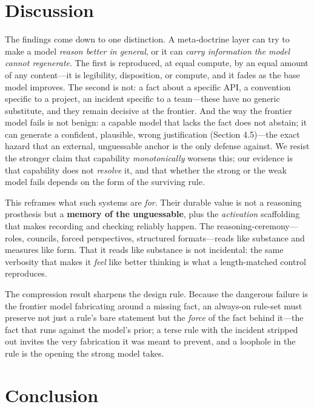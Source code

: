 \documentclass[11pt]{article}
\begin{document}
\section{Discussion}

The findings come down to one distinction. A meta-doctrine layer can try to make a model
\emph{reason better in general}, or it can \emph{carry information the model cannot regenerate}.
The first is reproduced, at equal compute, by an equal amount of any content---it is
legibility, disposition, or compute, and it fades as the base model improves. The second
is not: a fact about a specific API, a convention specific to a project, an incident
specific to a team---these have no generic substitute, and they remain decisive at the
frontier. And the way the frontier model fails is not benign: a capable model that lacks
the fact does not abstain; it can generate a confident, plausible, wrong justification
(Section 4.5)---the exact hazard that an external, unguessable anchor is the only defense
against. We resist the stronger claim that capability \emph{monotonically} worsens this; our
evidence is that capability does not \emph{resolve} it, and that whether the strong or the
weak model fails depends on the form of the surviving rule.

This reframes what such systems are \emph{for}. Their durable value is not a reasoning
prosthesis but a \textbf{memory of the unguessable}, plus the \emph{activation} scaffolding that
makes recording and checking reliably happen. The reasoning-ceremony---roles, councils,
forced perspectives, structured formats---reads like substance and measures like form.
That it reads like substance is not incidental: the same verbosity that makes it
\emph{feel} like better thinking is what a length-matched control reproduces.

The compression result sharpens the design rule. Because the dangerous failure is the
frontier model fabricating around a missing fact, an always-on rule-set must preserve not
just a rule's bare statement but the \emph{force} of the fact behind it---the fact that runs
against the model's prior; a terse rule with the incident stripped out invites the very
fabrication it was meant to prevent, and a loophole in the rule is the opening the strong
model takes.

\section{Conclusion}
\end{document}
